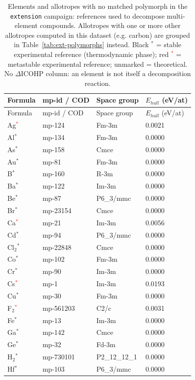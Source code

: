 \begin{longtable}{@{}llll@{}}
\caption{Elements and allotropes with no matched polymorph in the \texttt{extension} campaign: references used to decompose multi-element compounds. Allotropes with one or more other allotropes computed in this dataset (e.g. carbon) are grouped in Table~\ref{tab:ext-polymorphs} instead. Black $^*$ = stable experimental reference (thermodynamic phase); red \textcolor{red}{$^*$} = metastable experimental reference; unmarked = theoretical. No $\Delta$ICOHP column: an element is not itself a decomposition reaction.}\\
\toprule
Formula & mp-id / COD & Space group & $E_{hull}$ (eV/at) \\
\midrule
\endfirsthead
\toprule
Formula & mp-id / COD & Space group & $E_{hull}$ (eV/at) \\
\midrule
\endhead
\bottomrule
\endfoot
Ag\textcolor{red}{$^*$} & mp-124 & Fm-3m & 0.0021 \\
Al$^*$ & mp-134 & Fm-3m & 0.0000 \\
As$^*$ & mp-158 & Cmce & 0.0000 \\
Au$^*$ & mp-81 & Fm-3m & 0.0000 \\
B$^*$ & mp-160 & R-3m & 0.0000 \\
Ba$^*$ & mp-122 & Im-3m & 0.0000 \\
Be$^*$ & mp-87 & P6\_3/mmc & 0.0000 \\
Br$^*$ & mp-23154 & Cmce & 0.0000 \\
Ca\textcolor{red}{$^*$} & mp-21 & Im-3m & 0.0056 \\
Cd$^*$ & mp-94 & P6\_3/mmc & 0.0000 \\
Cl$_{2}$$^*$ & mp-22848 & Cmce & 0.0000 \\
Co$^*$ & mp-102 & Fm-3m & 0.0000 \\
Cr$^*$ & mp-90 & Im-3m & 0.0000 \\
Cs\textcolor{red}{$^*$} & mp-1 & Im-3m & 0.0193 \\
Cu$^*$ & mp-30 & Fm-3m & 0.0000 \\
F$_{2}$\textcolor{red}{$^*$} & mp-561203 & C2/c & 0.0031 \\
Fe$^*$ & mp-13 & Im-3m & 0.0000 \\
Ga$^*$ & mp-142 & Cmce & 0.0000 \\
Ge$^*$ & mp-32 & Fd-3m & 0.0000 \\
H$_{2}$$^*$ & mp-730101 & P2\_12\_12\_1 & 0.0000 \\
Hf$^*$ & mp-103 & P6\_3/mmc & 0.0000 \\

\end{longtable}

